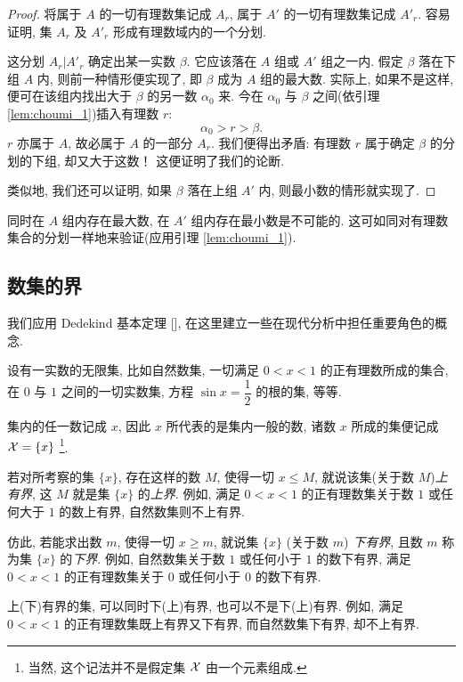 \begin{proof}
将属于 $A$ 的一切有理数集记成 $A_r$,
属于 $A'$ 的一切有理数集记成 $A'_r$.
容易证明, 集 $A_r$ 及 $A'_r$ 形成有理数域内的一个分划.

这分划 $A_r|A'_r$ 确定出某一实数 $\beta$.
它应该落在 $A$ 组或 $A'$ 组之一内.
假定 $\beta$ 落在下组 $A$ 内, 则前一种情形便实现了, 即 $\beta$ 成为 $A$ 组的最大数.
实际上, 如果不是这样, 便可在该组内找出大于 $\beta$ 的另一数 $\alpha_0$ 来.
今在 $\alpha_0$ 与 $\beta$ 之间(依引理 \ref{lem:choumi_1})插入有理数 $r$:
$$ \alpha_0 > r > \beta. $$
$r$ 亦属于 $A$, 故必属于 $A$ 的一部分 $A_r$.
我们便得出矛盾:
有理数 $r$ 属于确定 $\beta$ 的分划的下组, 却又大于这数！
这便证明了我们的论断.

类似地, 我们还可以证明, 如果 $\beta$ 落在上组 $A'$ 内, 则最小数的情形就实现了.
\end{proof}

\begin{remark}
同时在 $A$ 组内存在最大数, 在 $A'$ 组内存在最小数是不可能的.
这可如同对有理数集合的分划一样地来验证(应用引理 \ref{lem:choumi_1}).
\end{remark}

\subsection{数集的界}\label{subsec:11}

我们应用 Dedekind 基本定理 [],
在这里建立一些在现代分析中担任重要角色的概念.

设有一实数的无限集, 比如自然数集, 一切满足 $0<x<1$ 的正有理数所成的集合, 在 $0$ 与 $1$ 之间的一切实数集,
方程 $\sin x = \dfrac{1}{2}$ 的根的集, 等等.

集内的任一数记成 $x$, 因此 $x$ 所代表的是集内一般的数,
诸数 $x$ 所成的集便记成 $\mathcal{X} = \{x\}$
\footnote{当然, 这个记法并不是假定集 $\mathcal{X}$ 由一个元素组成.}.

{\kaishu
若对所考察的集 $\{x\}$,
存在这样的数 $M$,
使得一切 $x \leq M$,
就说该集(关于数 $M$)\emph{上有界},
这 $M$ 就是集 $\{x\}$ 的\emph{上界}.
}例如, 满足 $0<x<1$ 的正有理数集关于数 $1$ 或任何大于 $1$ 的数上有界, 自然数集则不上有界.

仿此,
{\kaishu
若能求出数 $m$,
使得一切 $x \geq m$,
就说集 $\{x\}$ (关于数 $m$) \emph{下有界},
且数 $m$ 称为集 $\{x\}$ 的\emph{下界}.
}
例如, 自然数集关于数 $1$ 或任何小于 $1$ 的数下有界, 满足 $0<x<1$ 的正有理数集关于 $0$ 或任何小于 $0$ 的数下有界.

上(下)有界的集, 可以同时下(上)有界, 也可以不是下(上)有界.
例如, 满足 $0<x<1$ 的正有理数集既上有界又下有界,
而自然数集下有界, 却不上有界.

